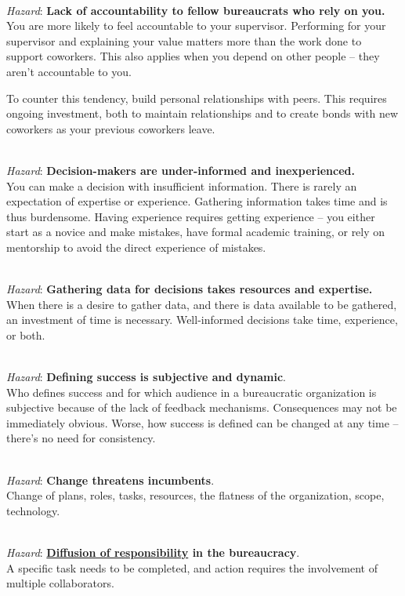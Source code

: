\ \\
\begin{samepage}
\textit{Hazard}: \textbf{Lack of accountability to fellow bureaucrats who rely on you.}\\
You are more likely to feel accountable to your supervisor. Performing for your supervisor and explaining your value matters more than the work done to support coworkers.  This also applies when you depend on other people -- they aren't accountable to you.

To counter this tendency, build personal relationships with peers. This requires ongoing investment, both to maintain relationships and to create bonds with new coworkers as your previous coworkers leave.
\end{samepage}

\ \\
\textit{Hazard}: \textbf{Decision-makers are under-informed and inexperienced.}\\
You can make a decision with insufficient information. There is rarely an expectation of expertise or experience. 
Gathering information takes time and is thus burdensome.
Having experience requires getting experience -- you either start as a novice and make mistakes, have formal academic training, or rely on mentorship to avoid the direct experience of mistakes.

\ \\
\textit{Hazard}: \textbf{Gathering data for decisions takes resources and expertise.}\\
When there is a desire to gather data, and there is data available to be gathered, an investment of time is necessary. Well-informed decisions take time, experience, or both.

\ \\
\textit{Hazard}: \textbf{Defining success is subjective and dynamic}. \\
Who defines success and for which audience in a bureaucratic organization is subjective because of the lack of feedback mechanisms. Consequences may not be immediately obvious. Worse, how success is defined can be changed at any time -- there's no need for consistency. 

\ \\
\textit{Hazard}: \textbf{Change threatens incumbents}. \\
Change of plans, roles, tasks, resources, the flatness of the organization, scope, technology.

\ \\
\textit{Hazard}: \textbf{\href{https://en.wikipedia.org/wiki/Diffusion_of_responsibility}{Diffusion of responsibility} 
in the bureaucracy}. \\
A specific task needs to be completed, and action requires the involvement of multiple collaborators. 


